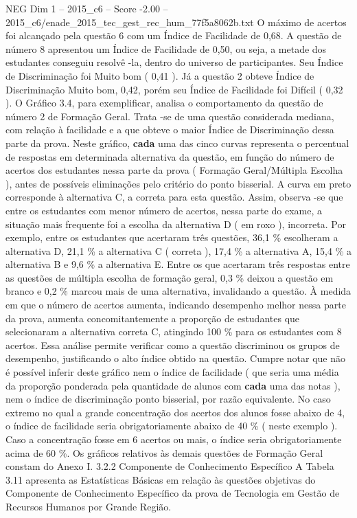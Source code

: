 \begin{textsample}{NEG Dim 1 – 2015\_c6 – Score -2.00 – 2015\_c6/enade\_2015\_tec\_gest\_rec\_hum\_77f5a8062b.txt}
O máximo de acertos foi alcançado pela questão 6 com um Índice de Facilidade de 0,68.
A questão de número 8 apresentou um Índice de Facilidade de 0,50, ou seja, a metade dos estudantes conseguiu resolvê -la, dentro do universo de participantes.
Seu Índice de Discriminação foi Muito bom ( 0,41 ).
Já a questão 2 obteve Índice de Discriminação Muito bom, 0,42, porém seu Índice de Facilidade foi Difícil ( 0,32 ).
O Gráfico 3.4, para exemplificar, analisa o comportamento da questão de número 2 de Formação Geral.
Trata -se de uma questão considerada mediana, com relação à facilidade e a que obteve o maior Índice de Discriminação dessa parte da prova.
Neste gráfico, \textbf{cada} uma das cinco curvas representa o percentual de respostas em determinada alternativa da questão, em função do número de acertos dos estudantes nessa parte da prova ( Formação Geral/Múltipla Escolha ), antes de possíveis eliminações pelo critério do ponto bisserial.
A curva em preto corresponde à alternativa C, a correta para esta questão.
Assim, observa -se que entre os estudantes com menor número de acertos, nessa parte do exame, a situação mais frequente foi a escolha da alternativa D ( em roxo ), incorreta.
Por exemplo, entre os estudantes que acertaram três questões, 36,1 \% escolheram a alternativa D, 21,1 \% a alternativa C ( correta ), 17,4 \% a alternativa A, 15,4 \% a alternativa B e 9,6 \% a alternativa E.
Entre os que acertaram três respostas entre as questões de múltipla escolha de formação geral, 0,3 \% deixou a questão em branco e 0,2 \% marcou mais de uma alternativa, invalidando a questão.
À medida em que o número de acertos aumenta, indicando desempenho melhor nessa parte da prova, aumenta concomitantemente a proporção de estudantes que selecionaram a alternativa correta C, atingindo 100 \% para os estudantes com 8 acertos.
Essa análise permite verificar como a questão discriminou os grupos de desempenho, justificando o alto índice obtido na questão.
Cumpre notar que não é possível inferir deste gráfico nem o índice de facilidade ( que seria uma média da proporção ponderada pela quantidade de alunos com \textbf{cada} uma das notas ), nem o índice de discriminação ponto bisserial, por razão equivalente.
No caso extremo no qual a grande concentração dos acertos dos alunos fosse abaixo de 4, o índice de facilidade seria obrigatoriamente abaixo de 40 \% ( neste exemplo ).
Caso a concentração fosse em 6 acertos ou mais, o índice seria obrigatoriamente acima de 60 \%.
Os gráficos relativos às demais questões de Formação Geral constam do Anexo I. 3.2.2 Componente de Conhecimento Específico A Tabela 3.11 apresenta as Estatísticas Básicas em relação às questões objetivas do Componente de Conhecimento Específico da prova de Tecnologia em Gestão de Recursos Humanos por Grande Região.

\end{textsample}
